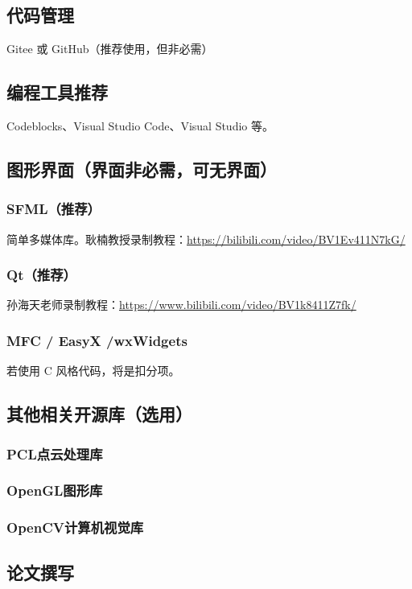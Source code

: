 \subsection{代码管理}
Gitee 或 GitHub（推荐使用，但非必需）

\subsection{编程工具推荐}
Codeblocks、Visual Studio Code、Visual Studio 等。

\subsection{图形界面（界面非必需，可无界面）}

\subsubsection{SFML（推荐）}
简单多媒体库。耿楠教授录制教程：\url{https://bilibili.com/video/BV1Ev411N7kG/}

\subsubsection{Qt（推荐）}
孙海天老师录制教程：\url{https://www.bilibili.com/video/BV1k8411Z7fk/}

\subsubsection{MFC / EasyX /wxWidgets}
若使用 C 风格代码，将是扣分项。



\subsection{其他相关开源库（选用）}
\subsubsection{PCL点云处理库}
\subsubsection{OpenGL图形库}
\subsubsection{OpenCV计算机视觉库}
\subsection{论文撰写}
